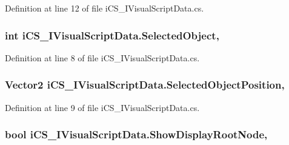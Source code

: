 Definition at line 12 of file i\+C\+S\+\_\+\+I\+Visual\+Script\+Data.\+cs.

\hypertarget{interfacei_c_s___i_visual_script_data_a71a91420adc27a5259d9ea9b09dc7dce}{
\subsubsection[{Selected\+Object}]{\setlength{\rightskip}{0pt plus 5cm}int i\+C\+S\+\_\+\+I\+Visual\+Script\+Data.\+Selected\+Object\hspace{0.3cm}{\ttfamily [get]}, {\ttfamily [set]}}}\label{interfacei_c_s___i_visual_script_data_a71a91420adc27a5259d9ea9b09dc7dce}


Definition at line 8 of file i\+C\+S\+\_\+\+I\+Visual\+Script\+Data.\+cs.

\hypertarget{interfacei_c_s___i_visual_script_data_a5621e5e8b6fc341c84ed69e2e9fd6303}{
\subsubsection[{Selected\+Object\+Position}]{\setlength{\rightskip}{0pt plus 5cm}Vector2 i\+C\+S\+\_\+\+I\+Visual\+Script\+Data.\+Selected\+Object\+Position\hspace{0.3cm}{\ttfamily [get]}, {\ttfamily [set]}}}\label{interfacei_c_s___i_visual_script_data_a5621e5e8b6fc341c84ed69e2e9fd6303}


Definition at line 9 of file i\+C\+S\+\_\+\+I\+Visual\+Script\+Data.\+cs.

\hypertarget{interfacei_c_s___i_visual_script_data_a84963c0b8e72b7d669e53022162ad830}{
\subsubsection[{Show\+Display\+Root\+Node}]{\setlength{\rightskip}{0pt plus 5cm}bool i\+C\+S\+\_\+\+I\+Visual\+Script\+Data.\+Show\+Display\+Root\+Node\hspace{0.3cm}{\ttfamily [get]}, {\ttfamily [set]}}}\label{interfacei_c_s___i_visual_script_data_a84963c0b8e72b7d669e53022162ad830}


